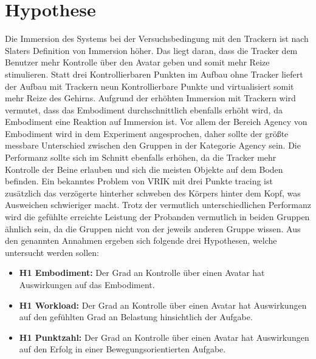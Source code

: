\section{Hypothese}
Die Immersion des Systems bei der Versuchsbedingung mit den Trackern ist nach Slaters Definition von Immersion \cite{Slater2003}\cite{Slater1999} höher. Das liegt daran, dass die Tracker dem Benutzer mehr Kontrolle über den Avatar geben und somit mehr Reize stimulieren. Statt drei Kontrollierbaren Punkten im Aufbau ohne Tracker liefert der Aufbau mit Trackern neun Kontrollierbare Punkte und virtualisiert somit mehr Reize des Gehirns.
Aufgrund der erhöhten Immersion mit Trackern wird vermutet, dass das Embodiment durchschnittlich ebenfalls erhöht wird, da Embodiment eine Reaktion auf Immersion ist. Vor allem der Bereich Agency von Embodiment wird in dem Experiment angesprochen, daher sollte der größte messbare Unterschied zwischen den Gruppen in der Kategorie Agency sein.
Die Performanz sollte sich im Schnitt ebenfalls erhöhen, da die Tracker mehr Kontrolle der Beine erlauben und sich die meisten Objekte auf dem Boden befinden. Ein bekanntes Problem von VRIK mit drei Punkte tracing ist zusätzlich das verzögerte hinterher schweben des Körpers hinter dem Kopf, was Ausweichen schwieriger macht. Trotz der vermutlich unterschiedlichen Performanz wird die gefühlte erreichte Leistung der Probanden vermutlich in beiden Gruppen ähnlich sein, da die Gruppen nicht von der jeweils anderen Gruppe wissen.
Aus den genannten Annahmen ergeben sich folgende drei Hypothesen, welche untersucht werden sollen:
\begin{itemize} 
\item \textbf{H1 Embodiment:} Der Grad an Kontrolle über einen Avatar hat Auswirkungen auf das Embodiment.
\item \textbf{H1 Workload:} Der Grad an Kontrolle über einen Avatar hat Auswirkungen auf den gefühlten Grad an Belastung hinsichtlich der Aufgabe.
\item \textbf{H1 Punktzahl:} Der Grad an Kontrolle über einen Avatar hat Auswirkungen auf den Erfolg in einer Bewegungsorientierten Aufgabe.
\end{itemize}


